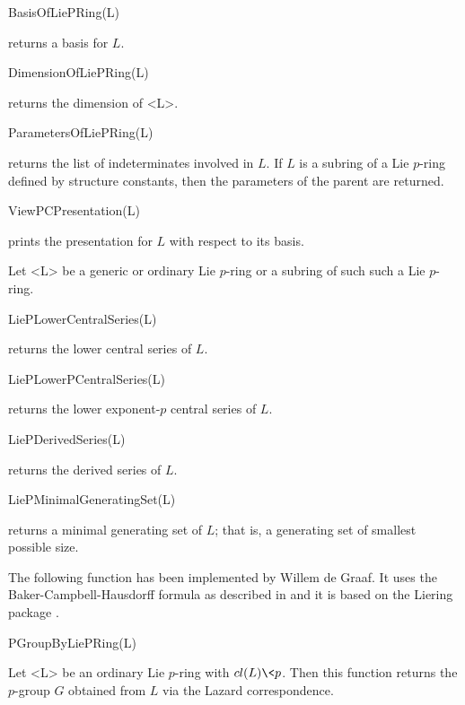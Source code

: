 \> BasisOfLiePRing(L)

returns a basis for $L$.

\> DimensionOfLiePRing(L)

returns the dimension of <L>.

\> ParametersOfLiePRing(L)

returns the list of indeterminates involved in $L$. If $L$ is a subring
of a Lie $p$-ring defined by structure constants, then the parameters of
the parent are returned. 

\> ViewPCPresentation(L)

prints the presentation for $L$ with respect to its basis. 


Let <L> be a generic or ordinary Lie $p$-ring or a subring of such such
a Lie $p$-ring. 

\> LiePLowerCentralSeries(L)

returns the lower central series of $L$. 

\> LiePLowerPCentralSeries(L)

returns the lower exponent-$p$ central series of $L$.

\> LiePDerivedSeries(L)

returns the derived series of $L$.

\> LiePMinimalGeneratingSet(L)

returns a minimal generating set of $L$; that is, a generating set of
smallest possible size.


The following function has been implemented by Willem de Graaf. It uses
the Baker-Campbell-Hausdorff formula as described in \cite{CGV12} and it 
is based on the Liering package \cite{CdG10}.

\> PGroupByLiePRing(L)

Let <L> be an ordinary Lie $p$-ring with $cl(L) \< p$. Then this function 
returns the $p$-group $G$ obtained from $L$ via the Lazard correspondence. 


